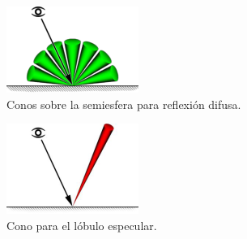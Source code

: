 \begin{figure}[H]
	\centering
	\begin{subfigure}[t]{.33\linewidth}
		\centering
		\captionsetup{justification=centering}
		\includegraphics[width=\linewidth]{media/diffuse_cones.png}
		\caption*{Conos sobre la semiesfera para reflexión difusa.}
	\end{subfigure}\hfill
	\begin{subfigure}[t]{.33\linewidth}
		\centering
		\captionsetup{justification=centering}
		\includegraphics[width=\linewidth]{media/spec_cone.png}
		\caption*{Cono para el lóbulo especular.}
	\end{subfigure}\hfill
	\begin{subfigure}[t]{.33\linewidth}
		\centering
		\captionsetup{justification=centering}

\end{subfigure}
\end{figure}
